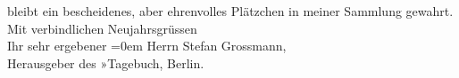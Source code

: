 \begin{ledgroupsized}[t]{13cm}
               bleibt ein bescheidenes, aber ehrenvolles Plätzchen in meiner Sammlung gewahrt.\pend
           \pstart
           Mit verbindlichen Neujahrsgrüssen{\\[\baselineskip]}Ihr sehr ergebener\pend
           \leftskip=0em{}{\bigskip}\pstart
           \noindent{}Herrn Stefan Grossmann,{\\}Herausgeber des »Tagebuch\label{T_L02459_1v}\label{T_L02459_1h}, Berlin.\pend
           \endnumbering{}\end{ledgroupsized}  \newcommand{\dateiname}{L02459}\newcommand{\titel}{Arthur Schnitzler an Stefan Großmann, 24. 12. 1925}\newcommand{\editorInnen}{Martin Anton Müller und Gerd-Hermann Susen}
            \footnotesize
\begin{ledgroupsized}[t]{11.5cm}
\end{ledgroupsized}
         
      